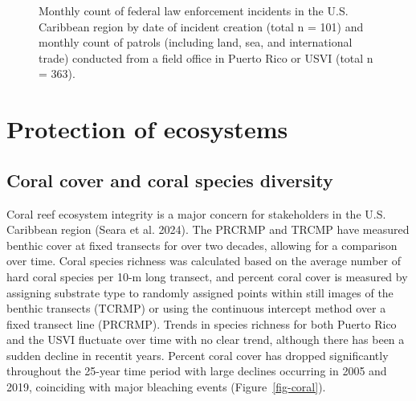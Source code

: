 \documentclass[
  letterpaper,
  oneside,
  open=any]{scrbook}
\begin{document}
\begin{figure}


\caption{\label{fig-law}Monthly count of federal law enforcement
incidents in the U.S. Caribbean region by date of incident creation
(total n = 101) and monthly count of patrols (including land, sea, and
international trade) conducted from a field office in Puerto Rico or
USVI (total n = 363).}

\end{figure}%

\section{Protection of ecosystems}\label{protection-of-ecosystems}

\subsection{Coral cover and coral species
diversity}\label{coral-cover-and-coral-species-diversity}

Coral reef ecosystem integrity is a major concern for stakeholders in
the U.S. Caribbean region (Seara et al. 2024). The PRCRMP and TRCMP have
measured benthic cover at fixed transects for over two decades, allowing
for a comparison over time. Coral species richness was calculated based
on the average number of hard coral species per 10-m long transect, and
percent coral cover is measured by assigning substrate type to randomly
assigned points within still images of the benthic transects (TCRMP) or
using the continuous intercept method over a fixed transect line
(PRCRMP). Trends in species richness for both Puerto Rico and the USVI
fluctuate over time with no clear trend, although there has been a
sudden decline in recentit years. Percent coral cover has dropped
significantly throughout the 25-year time period with large declines
occurring in 2005 and 2019, coinciding with major bleaching events
(Figure~\ref{fig-coral}).
\end{document}
